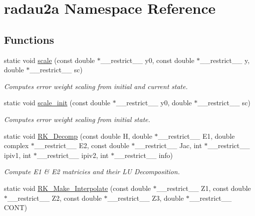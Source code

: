 \hypertarget{namespaceradau2a}{}\section{radau2a Namespace Reference}
\label{namespaceradau2a}
\subsection*{Functions}
\begin{DoxyCompactItemize}
\item 
static void \hyperlink{namespaceradau2a_ad92aba1b979853cd2b6102916a402904}{scale} (const double $\ast$\+\_\+\+\_\+restrict\+\_\+\+\_\+ y0, const double $\ast$\+\_\+\+\_\+restrict\+\_\+\+\_\+ y, double $\ast$\+\_\+\+\_\+restrict\+\_\+\+\_\+ sc)
\begin{DoxyCompactList}\small\item\em Computes error weight scaling from initial and current state. \end{DoxyCompactList}\item 
static void \hyperlink{namespaceradau2a_a093abea0d228c772d175be2927c5e80b}{scale\+\_\+init} (const double $\ast$\+\_\+\+\_\+restrict\+\_\+\+\_\+ y0, double $\ast$\+\_\+\+\_\+restrict\+\_\+\+\_\+ sc)
\begin{DoxyCompactList}\small\item\em Computes error weight scaling from initial state. \end{DoxyCompactList}\item 
static void \hyperlink{namespaceradau2a_a3f1f64d323b61c19b47b8bd0670802bd}{R\+K\+\_\+\+Decomp} (const double H, double $\ast$\+\_\+\+\_\+restrict\+\_\+\+\_\+ E1, double complex $\ast$\+\_\+\+\_\+restrict\+\_\+\+\_\+ E2, const double $\ast$\+\_\+\+\_\+restrict\+\_\+\+\_\+ Jac, int $\ast$\+\_\+\+\_\+restrict\+\_\+\+\_\+ ipiv1, int $\ast$\+\_\+\+\_\+restrict\+\_\+\+\_\+ ipiv2, int $\ast$\+\_\+\+\_\+restrict\+\_\+\+\_\+ info)
\begin{DoxyCompactList}\small\item\em Compute E1 \& E2 matricies and their LU Decomposition. \end{DoxyCompactList}\item 
static void \hyperlink{namespaceradau2a_a95409fe9e8a586b74e95cb084880daa5}{R\+K\+\_\+\+Make\+\_\+\+Interpolate} (const double $\ast$\+\_\+\+\_\+restrict\+\_\+\+\_\+ Z1, const double $\ast$\+\_\+\+\_\+restrict\+\_\+\+\_\+ Z2, const double $\ast$\+\_\+\+\_\+restrict\+\_\+\+\_\+ Z3, double $\ast$\+\_\+\+\_\+restrict\+\_\+\+\_\+ C\+O\+NT)

\end{DoxyCompactItemize}
